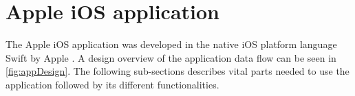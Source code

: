 \section{Apple iOS application}\label{sec:implApp}
The Apple iOS application was developed in the native iOS platform language Swift by Apple \cite{SwiftOrg}.
A design overview of the application data flow can be seen in \cref{fig:appDesign}.
The following sub-sections describes vital parts needed to use the application followed by its different functionalities.





